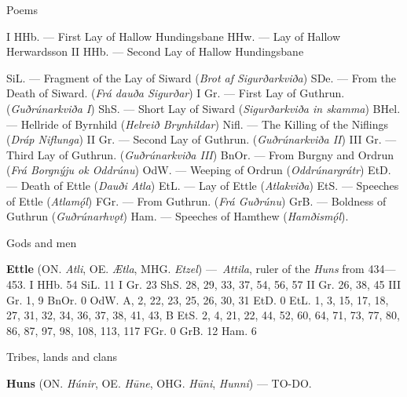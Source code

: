 Poems

I HHb. — First Lay of Hallow Hundingsbane
HHw. — Lay of Hallow Herwardsson
II HHb. — Second Lay of Hallow Hundingsbane

SiL. — Fragment of the Lay of Siward (\emph{Brot af Sigurðarkviða})
SDe. — From the Death of Siward. (\emph{Frá dauða Sigurðar})
I Gr. — First Lay of Guthrun. (\emph{Guðrúnarkviða I})
ShS. — Short Lay of Siward (\emph{Sigurðarkviða in skamma})
BHel. — Hellride of Byrnhild (\emph{Helreið Brynhildar})
Nifl. — The Killing of the Niflings (\emph{Dráp Niflunga})
II Gr. — Second Lay of Guthrun. (\emph{Guðrúnarkviða II})
III Gr. — Third Lay of Guthrun. (\emph{Guðrúnarkviða III})
BnOr. — From Burgny and Ordrun (\emph{Frá Borgnýju ok Oddrúnu})
OdW. — Weeping of Ordrun (\emph{Oddrúnargrátr})
EtD. — Death of Ettle (\emph{Dauði Atla})
EtL. — Lay of Ettle (\emph{Atlakviða})
EtS. — Speeches of Ettle (\emph{Atlamǫ́l})
FGr. — From Guthrun. (\emph{Frá Guðrúnu})
GrB. — Boldness of Guthrun (\emph{Guðrúnarhvǫt})
Ham. — Speeches of Hamthew (\emph{Hamðismǫ́l}).

Gods and men

\textbf{Ettle} (ON. \emph{Atli}, OE. \emph{Ætla}, MHG. \emph{Etzel}) — \emph{Attila}, ruler of the \emph{Huns} from 434—453.
 I HHb. 54
 SiL. 11
 I Gr. 23
 ShS. 28, 29, 33, 37, 54, 56, 57
 II Gr. 26, 38, 45
 III Gr. 1, 9
 BnOr. 0
 OdW. A, 2, 22, 23, 25, 26, 30, 31
 EtD. 0
 EtL. 1, 3, 15, 17, 18, 27, 31, 32, 34, 36, 37, 38, 41, 43, B
 EtS. 2, 4, 21, 22, 44, 52, 60, 64, 71, 73, 77, 80, 86, 87, 97, 98, 108, 113, 117
 FGr. 0
 GrB. 12
 Ham. 6

Tribes, lands and clans

\textbf{Huns} (ON. \emph{Húnir}, OE. \emph{Hūne}, OHG. \emph{Hūni}, \emph{Hunni}) — TO-DO.
